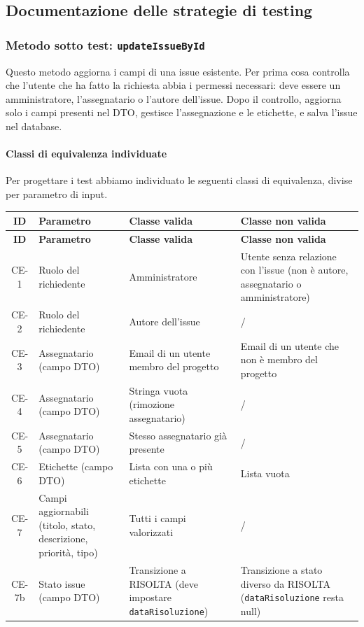\subsection{Documentazione delle strategie di testing}

\subsubsection{Metodo sotto test: \texttt{updateIssueById}}

Questo metodo aggiorna i campi di una issue esistente.
Per prima cosa controlla che l'utente che ha fatto la richiesta abbia i permessi necessari: deve essere un amministratore, l'assegnatario o l'autore dell'issue.
Dopo il controllo, aggiorna solo i campi presenti nel DTO, gestisce l'assegnazione e le etichette, e salva l'issue nel database.

\paragraph{Classi di equivalenza individuate}

Per progettare i test abbiamo individuato le seguenti classi di equivalenza, divise per parametro di input.

\begin{longtable}{|c|p{3.5cm}|p{5cm}|p{5cm}|}
\hline
\textbf{ID} & \textbf{Parametro} & \textbf{Classe valida} & \textbf{Classe non valida} \\
\hline
\endfirsthead
\hline
\textbf{ID} & \textbf{Parametro} & \textbf{Classe valida} & \textbf{Classe non valida} \\
\hline
\endhead
CE-1 &
Ruolo del richiedente &
Amministratore &
Utente senza relazione con l'issue (non \`e autore, assegnatario o amministratore) \\
\hline
CE-2 &
Ruolo del richiedente &
Autore dell'issue &
/ \\
\hline
CE-3 &
Assegnatario (campo DTO) &
Email di un utente membro del progetto &
Email di un utente che non \`e membro del progetto \\
\hline
CE-4 &
Assegnatario (campo DTO) &
Stringa vuota (rimozione assegnatario) &
/ \\
\hline
CE-5 &
Assegnatario (campo DTO) &
Stesso assegnatario gi\`a presente &
/ \\
\hline
CE-6 &
Etichette (campo DTO) &
Lista con una o pi\`u etichette &
Lista vuota \\
\hline
CE-7 &
Campi aggiornabili (titolo, stato, descrizione, priorit\`a, tipo) &
Tutti i campi valorizzati &
/ \\
\hline
CE-7b &
Stato issue (campo DTO) &
Transizione a RISOLTA (deve impostare \texttt{dataRisoluzione}) &
Transizione a stato diverso da RISOLTA (\texttt{dataRisoluzione} resta null) \\
\hline
\end{longtable}

